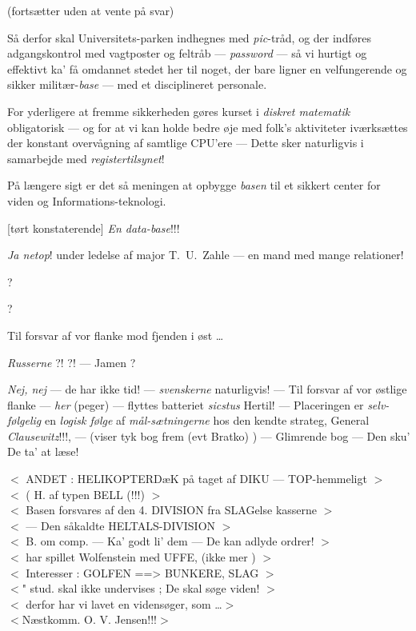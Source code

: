 \documentclass[a4paper,11pt]{article}
\begin{document}
\begin{sketch}
       (fortsætter uden at vente på svar)

       Så derfor skal Universitets-parken indhegnes med {\em pic}\/-tråd, og der
       indføres adgangskontrol med vagtposter og feltråb ---
       {\em password} --- så vi hurtigt og effektivt ka' få omdannet
       stedet her til noget, der bare ligner en velfungerende og
       sikker militær-{\em base} --- med et disciplineret personale.

       For yderligere at fremme sikkerheden gøres kurset i
       {\em diskret matematik}\/ obligatorisk --- og for at vi kan holde bedre øje
       med folk's aktiviteter iværksættes der konstant overvågning
       af samtlige CPU'ere --- Dette sker naturligvis i samarbejde med
       {\em registertilsynet}!

       På længere sigt er det så meningen at opbygge {\em basen}\/ til
       et sikkert center for viden og Informations-teknologi.

       
       [tørt konstaterende]  {\em En data-base}!!!

            {\em Ja netop}!  under ledelse af major T.\ U.\
       Zahle --- en mand med mange relationer! 


        ?

        ?



              Til forsvar af vor flanke mod fjenden i øst \dots

       
             {\em Russerne}\/ ?! ?! ---  Jamen ?

        {\em Nej, nej} --- de har ikke tid! --- {\em
         svenskerne} naturligvis! --- Til forsvar af vor østlige
       flanke --- {\em her} (peger) --- flyttes batteriet {\em
         sicstus}\/ Hertil! --- Placeringen er {\em selv-følgelig}\/
       en {\em logisk følge}\/ af {\em mål-sætningerne}\/ hos den
       kendte strateg, General {\em Clausewitz}!!!, --- (viser tyk bog
       frem (evt Bratko) ) --- Glimrende bog --- Den sku' De ta' at
       læse!

       $<$ ANDET : HELIKOPTERDæK på taget af DIKU --- TOP-hemmeligt
       $>$\\   $<$ ( H. af typen BELL (!!!)                     $>$\\  $<$
       Basen forsvares af den 4. DIVISION fra SLAGelse kasserne $>$\\  $<$
       --- Den såkaldte HELTALS-DIVISION $>$\\         $<$ B. om comp. --- Ka' godt
       li' dem --- De kan adlyde ordrer! $>$\\         $<$ har spillet Wolfenstein
       med UFFE, (ikke mer ) $>$\\     $<$ Interesser : GOLFEN ==> BUNKERE,
       SLAG $>$\\      $<$" stud. skal ikke undervises ; De skal søge viden!
       $>$\\   $<$ derfor har vi lavet en vidensøger, som \dots $>$\\
       $<$Næstkomm. O. V. Jensen!!!$>$\\


\end{sketch}
\end{document}
